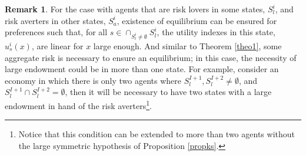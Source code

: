 \documentclass[pdftex]{article}
\numberwithin{equation}{section}
\theoremstyle{th}
\newtheorem{proof lemma}{{Proof Lemma}.}
\theoremstyle{definition}
\newtheorem{remark}{Remark}%
\newtheorem*{risk lovers}{Risk lovers}
\newtheorem*{risk averse}{Risk averse}
\begin{document}
\begin{remark}
For the case with agents that are risk lovers in some states, $S^i_l$, and risk averters in other states, $S^i_a$, existence of equilibrium can be ensured for preferences such that, for all $s\in\cap_{S^i_l\neq\emptyset}S^i_l$, the utility indexes in this state, $u^i_s(x)$, are linear for $x$ large enough. And similar to Theorem \ref{theo1}, some aggregate risk is necessary to ensure an equilibrium; in this case, the necessity of large endowment could be in more than one state. For example, consider an economy in which there is only two agents where $S^{I+1}_l,S^{I+2}_l\neq\emptyset$, and $S^{I+1}_l\cap{S}^{I+2}_l=\emptyset$, then it will be necessary to have two states with a large endowment in hand of the risk averters\footnote{Notice that this condition can be extended to more than two agents without the large symmetric hypothesis of Proposition \ref{propks}.}.


\end{remark}
\end{document}
